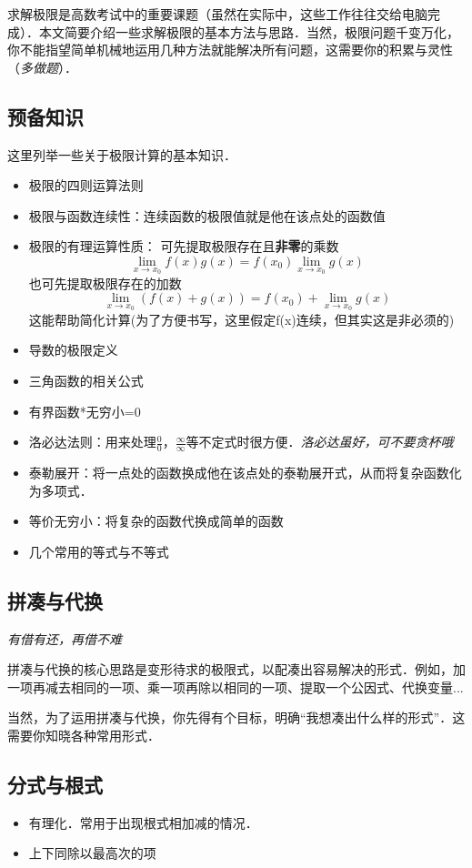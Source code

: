 
\begin{issues}
\issueDraft
\end{issues}

求解极限是高数考试中的重要课题（虽然在实际中，这些工作往往交给电脑完成）．本文简要介绍一些求解极限的基本方法与思路．当然，极限问题千变万化，你不能指望简单机械地运用几种方法就能解决所有问题，这需要你的积累与灵性（\textsl{多做题}）．

\subsection{预备知识}
这里列举一些关于极限计算的基本知识．
\begin{itemize}
\item 极限的四则运算法则
\item 极限与函数连续性：连续函数的极限值就是他在该点处的函数值
\item 极限的有理运算性质：
可先提取极限存在且\textbf{非零}的乘数 
$$\lim_{x\to x_0} f(x)g(x) = f(x_0)\lim_{x\to x_0} g(x)$$
也可先提取极限存在的加数
$$\lim_{x\to x_0} (f(x)+g(x)) = f(x_0)+\lim_{x\to x_0} g(x)$$
这能帮助简化计算(为了方便书写，这里假定f(x)连续，但其实这是非必须的)
\item 导数的极限定义
\item 三角函数的相关公式
\item 有界函数*无穷小=0
\item 洛必达法则：用来处理$\frac{0}{0}$，$\frac{\infty}{\infty}$等不定式时很方便．\textsl{洛必达虽好，可不要贪杯哦}
\item 泰勒展开：将一点处的函数换成他在该点处的泰勒展开式，从而将复杂函数化为多项式．
\item 等价无穷小：将复杂的函数代换成简单的函数
\item 几个常用的等式与不等式
\end{itemize}

\subsection{拼凑与代换}
\textsl{有借有还，再借不难}

拼凑与代换的核心思路是变形待求的极限式，以配凑出容易解决的形式．例如，加一项再减去相同的一项、乘一项再除以相同的一项、提取一个公因式、代换变量...

当然，为了运用拼凑与代换，你先得有个目标，明确“我想凑出什么样的形式”．这需要你知晓各种常用形式．

\subsection{分式与根式}
\begin{itemize}
\item 有理化．常用于出现根式相加减的情况．
\item 上下同除以最高次的项
\end{itemize}

